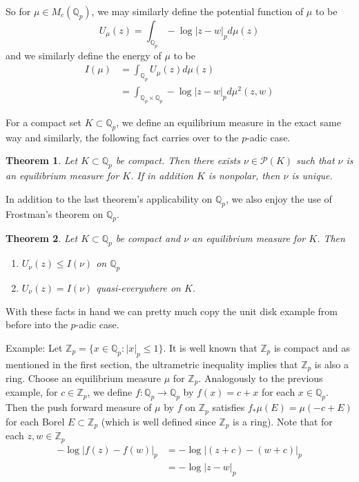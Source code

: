 \documentclass{amsart}
\newtheorem{thm}{Theorem}[section]
\newcommand{\Z}{\mathbb{Z}}
\newcommand{\Q}{\mathbb{Q}}
\newcommand{\MCP}{\mathcal{P}}
\begin{document}
So for $\mu \in M_c(\Q_p)$, we may similarly define the potential function of $\mu$ to be $$U_{\mu}(z) = \int_{\Q_p}-\log|z-w|_pd\mu (z)$$ and we similarly define the energy of $\mu$ to be 
\begin{align*}
I(\mu) 
&= \int_{\Q_p}U_{\mu}(z)d \mu (z)\\
&= \int_{\Q_p \times \Q_p}-\log|z-w|_p d\mu^2(z,w)
\end{align*}

For a compact set $K \subset \Q_p$, we define an equilibrium measure in the exact same way and similarly, the following fact carries over to the $p$-adic case.

\begin{thm}
Let $K \subset \Q_p$ be compact. Then there exists $\nu \in \MCP(K)$ such that $\nu$ is an equilibrium measure for $K$. If in addition $K$ is nonpolar, then $\nu$ is unique.
\end{thm}

In addition to the last theorem's applicability on $\Q_p$, we also enjoy the use of Frostman's theorem on $\Q_p$.

\begin{thm}
Let $K \subset \Q_p$ be compact and $\nu$ an equilibrium measure for $K$. Then 
\begin{enumerate}
\item $U_\nu(z) \leq I(\nu)$ on $\Q_p$
\item $U_\nu(z) = I(\nu)$ quasi-everywhere on $K$. 
\end{enumerate}
\end{thm}

With these facts in hand we can pretty much copy the unit disk example from before into the $p$-adic case.

Example: Let $\Z_p = \{x \in \Q_p: |x|_p \leq 1\}$. It is well known that $\Z_p$ is compact and as mentioned in the first section, the ultrametric inequality implies that $\Z_p$ is also a ring. Choose an equilibrium measure $\mu$ for $\Z_p$. Analogously to the previous example, for $c \in \Z_p$, we define $f:\Q_p \rightarrow \Q_p$ by $f(x) = c + x$ for each $x \in \Q_p$. Then the push forward measure of $\mu$ by $f$ on $\Z_p$ satisfies $f_*\mu(E) = \mu(-c + E)$ for each Borel $E \subset \Z_p$ (which is well defined since $\Z_p$ is a ring). Note that for each $z,w \in \Z_p$  
\begin{align*}
-\log|f(z)-f(w)|_p 
&= -\log|(z+c) - (w+c)|_p\\
&= -\log|z-w|_p 
\end{align*} 
\end{document}
